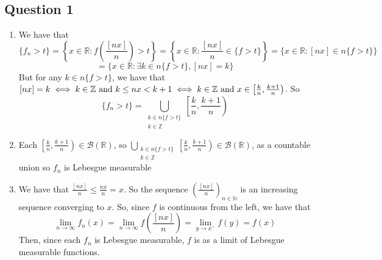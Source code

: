 \documentclass[letterpaper, 11pt]{article}
\newcommand{\1}{\mathds{1}}	%
\theoremstyle{definition}
\begin{document}
\subsection*{Question 1}

\begin{enumerate}
	\item [(a)] We have that \[\{f_n > t\} = \left \{x \in \mathbb{R} : f \left (\frac{[nx]}{n} \right ) > t \right \} = \left \{x \in \mathbb{R} : \frac{[nx]}{n} \in \{f>t\} \right \} = \{x \in \mathbb{R} : [nx] \in n\{f > t\}\} \]\[= \{x \in \mathbb{R}: \exists k \in n\{f>t\}, [nx]=k\} \]
	But for any $k \in n\{f>t\}$, we have that $[nx] = k \iff k \in \mathbb{Z} \text{ and } k \le nx < k+1 \iff k \in \mathbb{Z} \text{ and } \\ x \in \left [ \frac{k}{n}, \frac{k+1}{n}\right )$. So
	\[
	\{f_n > t\} = \bigcup \limits _{\substack{k \in n\{f>t\} \\ k \in \mathbb{Z}}} \left [ \frac{k}{n}, \frac{k+1}{n}\right )
	\]
	
	\item [(b)] Each $\left [ \frac{k}{n}, \frac{k+1}{n}\right ) \in \mathcal{B}(\mathbb{R})$, so $\bigcup \limits 
	_{\substack{k \in n\{f>t\} \\ k \in \mathbb{Z}}} \left [ \frac{k}{n}, \frac{k+1}{n}\right ) \in \mathcal{B}(\mathbb{R})$, as a countable union so $f_n$ is Lebesgue measurable
	
	\item [(c)] We have that $\frac{[nx]}{n} \le \frac{nx}{n} = x$. So the sequence $\left (\frac{[nx]}{n} \right )_{n \in \mathbb{N}}$ is an increasing sequence converging to $x$. So, since $f$ is continuous from the left, we have that 
	\[
	\lim \limits _{n \to \infty} f_n(x) = \lim \limits _{n \to \infty} f \left ( \frac{[nx]}{n}\right ) = \lim \limits _{y \to x^-} f(y) = f(x)
	\]
	Then, since each $f_n$ is Lebesgue measurable, $f$ is as a limit of Lebesgue measurable functions.
\end{enumerate}
\end{document}
